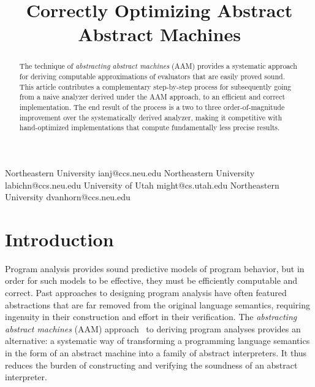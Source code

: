\documentclass[preprint,onecolumn,9pt]{sigplanconf} %
\newcommand{\naive}{naive}
\begin{document}
\copyrightdata{[to be supplied]}


\title{Correctly Optimizing Abstract Abstract Machines}

           {Northeastern University}
           {ianj@ccs.neu.edu}
           {Northeastern University}
           {labichn@ccs.neu.edu}
           {University of Utah}
           {might@cs.utah.edu}
           {Northeastern University}
           {dvanhorn@ccs.neu.edu}
\maketitle

\begin{abstract}
The technique of \emph{abstracting abstract machines} (AAM) provides a
systematic approach for deriving computable approximations of
evaluators that are easily proved sound.
%
This article contributes a complementary step-by-step process for
subsequently going from a \naive{} analyzer derived under the AAM
approach, to an efficient and correct implementation.  The end result
of the process is a two to three order-of-magnitude improvement over
the systematically derived analyzer, making it competitive with
hand-optimized implementations that compute fundamentally less precise
results.
\end{abstract}




\section{Introduction}

Program analysis provides sound predictive models of program behavior, but
in order for such models to be effective, they must be efficiently
computable and correct.  Past approaches to designing program analysis
have often featured abstractions that are far removed from the
original language semantics, requiring ingenuity in their construction
and effort in their verification.
%
The \emph{abstracting abstract machines} (AAM)
approach~\cite{dvanhorn:VanHorn2011Abstracting,dvanhorn:VanHorn2012Systematic}
to deriving program analyses provides an alternative: a systematic way
of transforming a programming language semantics in the form of an
abstract machine into a family of abstract interpreters.  It thus reduces
the burden of constructing and verifying the soundness of an abstract
interpreter.
%
\end{document}
